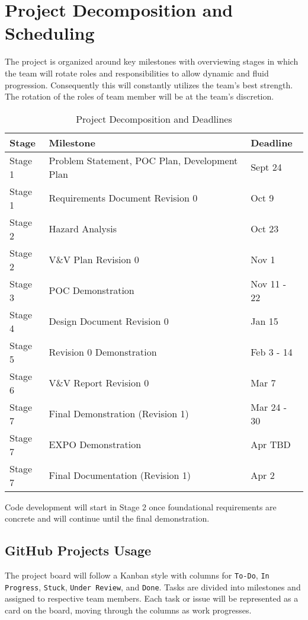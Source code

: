\documentclass{article}
\begin{document}
\section{Project Decomposition and Scheduling}

The project is organized around key milestones with overviewing stages in which the team will rotate roles and responsibilities to allow dynamic and fluid progression. Consequently this will constantly utilizes the team’s best strength. The rotation of the roles of team member will be at the team’s discretion.

\begin{table}[htbp]
    \centering
    \begin{tabular}{|l|l|l|}
    \hline
    Stage & Milestone & Deadline \\
    \hline
    Stage 1 & Problem Statement, POC Plan, Development Plan & Sept 24 \\
    Stage 1 & Requirements Document Revision 0 & Oct 9 \\
    \hline
    Stage 2 & Hazard Analysis & Oct 23 \\
    Stage 2 & V\&V Plan Revision 0 & Nov 1 \\
    \hline
    Stage 3 & POC Demonstration & Nov 11 - 22 \\
    \hline
    Stage 4 & Design Document Revision 0 & Jan 15 \\
    \hline
    Stage 5 & Revision 0 Demonstration & Feb 3 - 14\\
    \hline
    Stage 6 & V\&V Report Revision 0 & Mar 7 \\
    \hline
    Stage 7 & Final Demonstration (Revision 1) & Mar 24 - 30\\
    Stage 7 & EXPO Demonstration & Apr TBD \\
    Stage 7 & Final Documentation (Revision 1) & Apr 2 \\
    \hline
    \end{tabular}
    \caption{Project Decomposition and Deadlines}
\end{table}

Code development will start in Stage 2 once foundational requirements are concrete and will continue until the final demonstration.

\subsection{GitHub Projects Usage}

The project board will follow a Kanban style with columns for \texttt{To-Do}, \texttt{In Progress}, \texttt{Stuck}, \texttt{Under Review}, and \texttt{Done}. Tasks are divided into milestones and assigned to respective team members. Each task or issue will be represented as a card on the board, moving through the columns as work progresses.
\end{document}
